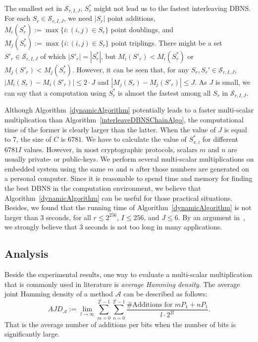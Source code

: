 The smallest set in $\mathcal{S}_{r, I, J}$, $S^*_r$ might not lead us to the fastest interleaving DBNS.
For each $S_r \in \mathcal{S}_{r, I, J}$, we need $|S_r|$ point additions,
$M_i(S^*_r) := \max \{i : (i,j) \in S_r\}$ point doublings, and $M_j(S^*_r) := \max \{i : (i,j) \in S_r\}$ point triplings.
There might be a set $S'_r \in \mathcal{S}_{r, I, J}$ of which $|S'_r| = |S^*_r|$, but $M_i(S'_r) < M_i(S^*_r)$ or $M_j(S'_r) < M_j(S^*_r)$.
However, it can be seen that, for any $S_r, S_r' \in \mathcal{S}_{r, I, J}$, $|M_i(S_r) - M_i(S'_r)| \leq 2 \cdot J$ and $|M_j(S_r) - M_j(S'_r)| \leq J$.
As $J$ is small, we can say that a computation using $S^*_r$ is almost the fastest among all $S_r$ in $\mathcal{S}_{r,I,J}$.

Although Algorithm~\ref{dynamicAlgorithm} potentially leads to a faster multi-scalar multiplication than Algorithm~\ref{interleaveDBNSChainAlgo},
the computational time of the former is clearly larger than the latter.
When the value of $J$ is equal to $7$, the size of $C$ is $6781$.
We have to calculate the value of $S^*_{x,i}$ for different $6781I$ values.
However, in most cryptographic protocols, scalars $m$ and $n$ are usually private- or public-keys.
We perform several multi-scalar multiplications on embedded system using the same $m$ and $n$ after those numbers are generated on a personal computer. 
Since it is reasonable to spend time and memory for finding the best DBNS in the computation environment,
we believe that Algorithm~\ref{dynamicAlgorithm} can be useful for those practical situations.
Besides, we found that the running time of Algorithm~\ref{dynamicAlgorithm} is not larger than $3$ seconds,
for all $r \leq 2^{256}$, $I \leq 256$, and $J \leq 6$.
By an argument in~\cite{experiment}, we strongly believe that $3$ seconds is not too long in many applications.

\subsection{Analysis}
\label{analysis}

Beside the experimental results, one way to evaluate a multi-scalar multiplication that is commonly used in literature is \textit{average Hamming density}.
The average joint Hamming density of a method $\mathcal{A}$ can be described as follows:
$$AJD_\mathcal{A} := \lim\limits_{l \rightarrow \infty} \sum_{m = 0}^{2^l - 1} \sum_{n = 0}^{2^l - 1} \frac{\text{\#Additions for } mP_1 + nP_1}{l \cdot 2^{2l}}.$$
That is the average number of additions per bits when the number of bits is significantly large. 

